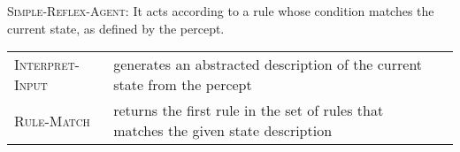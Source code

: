 \vspace{0.5cm}


\begin{algorithm}[H]
    \caption{\textsc{Simple-Reflex-Agent}: It acts according to a rule whose condition matches the current state, as defined by the percept. \cite{ai/book/Artificial-Intelligence-A-Modern-Approach/Russell-Norvig}}

\end{algorithm}

\vspace{0.3cm}

\begin{customArrayStretch}{1.2}
\begin{longtable}{l p{12cm} l}

\textsc{Interpret-Input} & 
    generates an abstracted description of the current state from the percept &
    \cite{ai/book/Artificial-Intelligence-A-Modern-Approach/Russell-Norvig} \\

\textsc{Rule-Match} & 
    returns the first rule in the set of rules that matches the given state description &
    \cite{ai/book/Artificial-Intelligence-A-Modern-Approach/Russell-Norvig} \\

\end{longtable}
\end{customArrayStretch}










